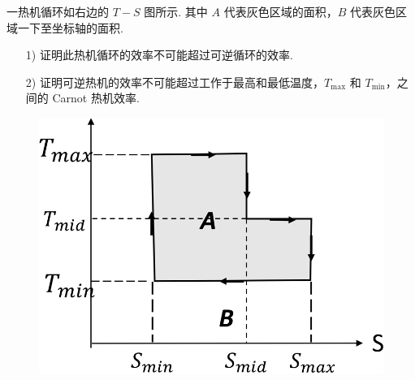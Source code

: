 \documentclass{assignment}
\begin{document}
\begin{prob}
    一热机循环如右边的 $T-S$ 图所示. 其中 $A$ 代表灰色区域的面积，$B$ 代表灰色区域一下至坐标轴的面积.
    \begin{itemize}
        \item[1)] 证明此热机循环的效率不可能超过可逆循环的效率.
        \item[2)] 证明可逆热机的效率不可能超过工作于最高和最低温度，$T_{\max}$ 和 $T_{\min}$，之间的 Carnot 热机效率.
    \end{itemize}
    \begin{figure}[h]
        \centering
        \includegraphics[width=.4\columnwidth]{A2-P3-2.png}
    \end{figure}
\end{prob}
\end{document}
